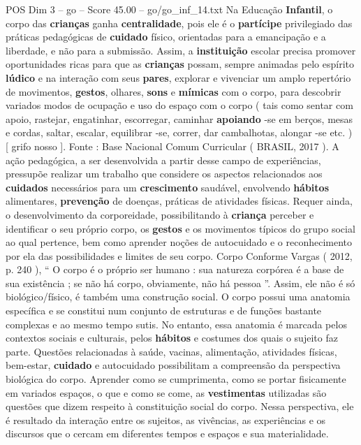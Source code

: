 \begin{textsample}{POS Dim 3 – go – Score 45.00 – go/go\_inf\_14.txt}
Na Educação \textbf{Infantil}, o corpo das \textbf{crianças} ganha \textbf{centralidade}, pois ele é o \textbf{partícipe} privilegiado das práticas pedagógicas de \textbf{cuidado} físico, orientadas para a emancipação e a liberdade, e não para a submissão.
Assim, a \textbf{instituição} escolar precisa promover oportunidades ricas para que as \textbf{crianças} possam, sempre animadas pelo espírito \textbf{lúdico} e na interação com seus \textbf{pares}, explorar e vivenciar um amplo repertório de movimentos, \textbf{gestos}, olhares, \textbf{sons} e \textbf{mímicas} com o corpo, para descobrir variados modos de ocupação e uso do espaço com o corpo ( tais como sentar com apoio, rastejar, engatinhar, escorregar, caminhar \textbf{apoiando} -se em berços, mesas e cordas, saltar, escalar, equilibrar -se, correr, dar cambalhotas, alongar -se etc. ) [ grifo nosso ].
Fonte : Base Nacional Comum Curricular ( BRASIL, 2017 ).
A ação pedagógica, a ser desenvolvida a partir desse campo de experiências, pressupõe realizar um trabalho que considere os aspectos relacionados aos \textbf{cuidados} necessários para um \textbf{crescimento} saudável, envolvendo \textbf{hábitos} alimentares, \textbf{prevenção} de doenças, práticas de atividades físicas.
Requer ainda, o desenvolvimento da corporeidade, possibilitando à \textbf{criança} perceber e identificar o seu próprio corpo, os \textbf{gestos} e os movimentos típicos do grupo social ao qual pertence, bem como aprender noções de autocuidado e o reconhecimento por ela das possibilidades e limites de seu corpo.
Corpo Conforme Vargas ( 2012, p. 240 ), “ O corpo é o próprio ser humano : sua natureza corpórea é a base de sua existência ; se não há corpo, obviamente, não há pessoa ”.
Assim, ele não é só biológico/físico, é também uma construção social.
O corpo possui uma anatomia específica e se constitui num conjunto de estruturas e de funções bastante complexas e ao mesmo tempo sutis.
No entanto, essa anatomia é marcada pelos contextos sociais e culturais, pelos \textbf{hábitos} e costumes dos quais o sujeito faz parte.
Questões relacionadas à saúde, vacinas, alimentação, atividades físicas, bem-estar, \textbf{cuidado} e autocuidado possibilitam a compreensão da perspectiva biológica do corpo.
Aprender como se cumprimenta, como se portar fisicamente em variados espaços, o que e como se come, as \textbf{vestimentas} utilizadas são questões que dizem respeito à constituição social do corpo.
Nessa perspectiva, ele é resultado da interação entre os sujeitos, as vivências, as experiências e os discursos que o cercam em diferentes tempos e espaços e sua materialidade.

\end{textsample}
